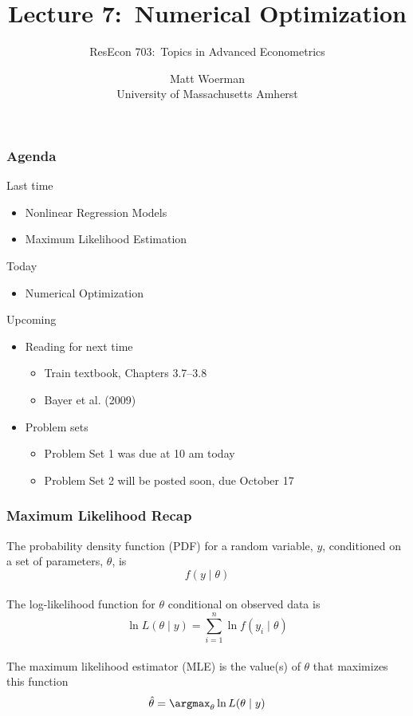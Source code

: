 \documentclass{beamer}
\title[Lecture 7:\ Numerical Optimization]{Lecture 7:\ Numerical Optimization}
\author[ResEcon 703:\ Advanced Econometrics]{ResEcon 703:\ Topics in Advanced Econometrics}
\date{Matt Woerman\\University of Massachusetts Amherst}
\begin{document}
{ 
\begin{frame}[noframenumbering]
    \titlepage
\end{frame}
}

\begin{frame}\frametitle{Agenda}
    Last time
    \begin{itemize}
        \item Nonlinear Regression Models
        \item Maximum Likelihood Estimation
    \end{itemize}
    \vspace{2ex}
    Today
    \begin{itemize}
    	\item Numerical Optimization
    \end{itemize}
    \vspace{2ex}
    Upcoming
    \begin{itemize}
        \item Reading for next time
        \begin{itemize}
            \item Train textbook, Chapters 3.7--3.8
            \item Bayer et al. (2009)
        \end{itemize}
        \item Problem sets
        \begin{itemize}
            \item Problem Set 1 was due at 10 am today
            \item Problem Set 2 will be posted soon, due October 17
        \end{itemize}
    \end{itemize}
\end{frame}

\begin{frame}\frametitle{Maximum Likelihood Recap}
    The probability density function (PDF) for a random variable, $y$, conditioned on a set of parameters, $\theta$, is
    $$f(y \mid \theta)$$ \\
    The log-likelihood function for $\theta$ conditional on observed data is
    $$\ln L(\theta \mid y) = \sum_{i = 1}^n \ln f(y_i \mid \theta)$$ \\
    The maximum likelihood estimator (MLE) is the value(s) of $\theta$ that maximizes this function
    $$\hat{\theta} = \argmax_\theta \ln L(\theta \mid y)$$
\end{frame}
\end{document}
